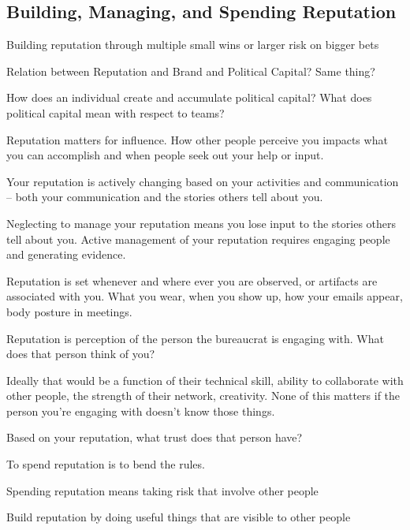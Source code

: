 \subsection{Building, Managing, and Spending Reputation\label{sec:reputation}}

Building reputation through multiple small wins or larger risk on bigger bets


Relation between Reputation and Brand and Political Capital? Same thing?


How does an individual create and accumulate political capital? What does political capital mean with respect to teams?


Reputation matters for influence. How other people perceive you impacts what you can accomplish and when people seek out your help or input.

Your reputation is actively changing based on your activities and communication -- both your communication and the stories others tell about you.

Neglecting to manage your reputation means you lose input to the stories others tell about you. Active management of your reputation requires engaging people and generating evidence. 

Reputation is set whenever and where ever you are observed, or artifacts are associated with you. What you wear, when you show up, how your emails appear, body posture in meetings. 


Reputation is perception of the person the bureaucrat is engaging with.  What does that person think of you?

Ideally that would be a function of their technical skill, ability to collaborate with other people, the strength of their network, creativity. None of this matters if the person you're engaging with doesn't know those things. 

Based on your reputation, what trust does that person have? 

To spend reputation is to bend the rules. 

Spending reputation means taking risk that involve other people

Build reputation by doing useful things that are visible to other people
